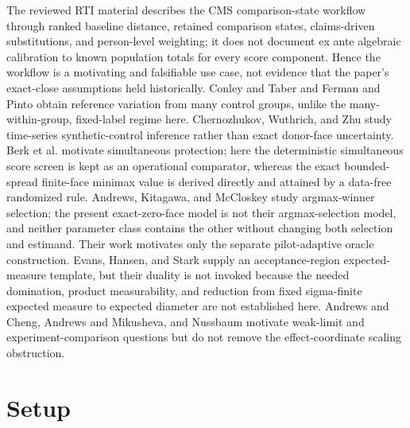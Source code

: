 \documentclass{article}
\begin{document}
The reviewed RTI material describes the CMS comparison-state workflow through ranked baseline distance, retained comparison states, claims-driven substitutions, and person-level weighting; it does not document ex ante algebraic calibration to known population totals for every score component. Hence the workflow is a motivating and falsifiable use case, not evidence that the paper's exact-close assumptions held historically. Conley and Taber and Ferman and Pinto obtain reference variation from many control groups, unlike the many-within-group, fixed-label regime here. Chernozhukov, Wuthrich, and Zhu study time-series synthetic-control inference rather than exact donor-face uncertainty. Berk et al. motivate simultaneous protection; here the deterministic simultaneous score screen is kept as an operational comparator, whereas the exact bounded-spread finite-face minimax value is derived directly and attained by a data-free randomized rule. Andrews, Kitagawa, and McCloskey study argmax-winner selection; the present exact-zero-face model is not their argmax-selection model, and neither parameter class contains the other without changing both selection and estimand. Their work motivates only the separate pilot-adaptive oracle construction. Evans, Hansen, and Stark supply an acceptance-region expected-measure template, but their duality is not invoked because the needed domination, product measurability, and reduction from fixed sigma-finite expected measure to expected diameter are not established here. Andrews and Cheng, Andrews and Mikusheva, and Nussbaum motivate weak-limit and experiment-comparison questions but do not remove the effect-coordinate scaling obstruction.

\section{Setup}
\end{document}
